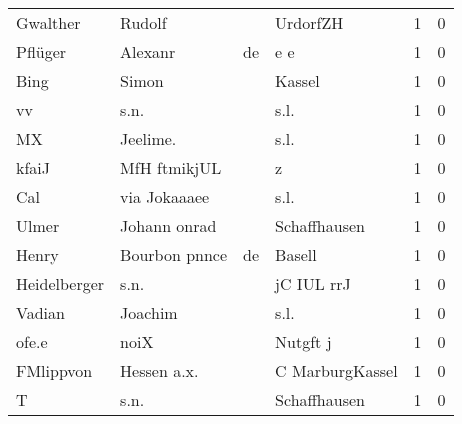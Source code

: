 \begin{center}
\begin{tiny}
\begin{longtabu}{llllrr}
                 Gwalther &                             Rudolf &             &                                    UrdorfZH &          1 &         0 \\
                  Pflüger &                            Alexanr &          de &                                         e e &          1 &         0 \\
                     Bing &                              Simon &             &                                      Kassel &          1 &         0 \\
                       vv &                               s.n. &             &                                        s.l. &          1 &         0 \\
                       MX &                           Jeelime. &             &                                        s.l. &          1 &         0 \\
                    kfaiJ &                       MfH ftmikjUL &             &                                           z &          1 &         0 \\
                      Cal &                       via Jokaaaee &             &                                        s.l. &          1 &         0 \\
                    Ulmer &                       Johann onrad &             &                                Schaffhausen &          1 &         0 \\
                    Henry &                      Bourbon pnnce &          de &                                      Basell &          1 &         0 \\
             Heidelberger &                               s.n. &             &                                  jC IUL rrJ &          1 &         0 \\
                   Vadian &                            Joachim &             &                                        s.l. &          1 &         0 \\
                    ofe.e &                               noiX &             &                                    Nutgft j &          1 &         0 \\
                FMlippvon &                        Hessen a.x. &             &                             C MarburgKassel &          1 &         0 \\
                        T &                               s.n. &             &                                Schaffhausen &          1 &         0 \\

\end{longtabu}
\end{tiny}
\end{center}
